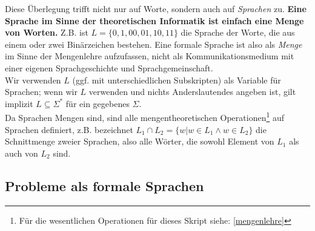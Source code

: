 
Diese Überlegung trifft nicht nur auf Worte, sondern auch auf \emph{Sprachen} zu.
\textbf{Eine Sprache im Sinne der theoretischen Informatik ist einfach eine Menge von Worten.}
Z.B. ist $L = \{0, 1, 00, 01, 10, 11 \}$ die Sprache der Worte,
die aus einem oder zwei Binärzeichen bestehen.
Eine formale Sprache ist also als \emph{Menge} im Sinne der Mengenlehre aufzufassen, 
nicht als Kommunikationsmedium mit einer eigenen Sprachgeschichte und Sprachgemeinschaft.\\

\noindent
Wir verwenden $L$ (ggf. mit unterschiedlichen Subskripten) als Variable für Sprachen;
wenn wir $L$ verwenden und nichts Anderslautendes angeben ist,
gilt implizit $L \subseteq \Sigma^*$ für ein gegebenes $\Sigma$.\\

\noindent
Da Sprachen Mengen sind,
sind alle mengentheoretischen Operationen\footnote{
    Für die wesentlichen Operationen für dieses Skript siehe: \autoref{mengenlehre}}
auf Sprachen definiert,
z.B. bezeichnet $L_1 \cap L_2 = \{w | w \in L_1 \wedge w \in L_2\}$
die Schnittmenge zweier Sprachen, also alle Wörter,
die sowohl Element von $L_1$ als auch von $L_2$ sind.



\subsection{Probleme als formale Sprachen}\label{subsec:problemeAlsFormaleSprachen}

